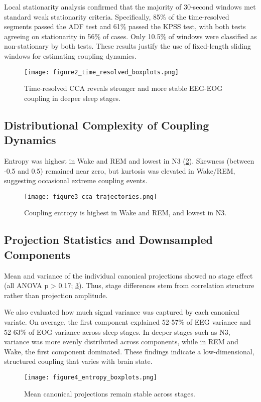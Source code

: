 Local stationarity analysis confirmed that the majority of 30-second windows met standard weak stationarity criteria. Specifically, 85\% of the time-resolved segments passed the ADF test and 61\% passed the KPSS test, with both tests agreeing on stationarity in 56\% of cases. Only 10.5\% of windows were classified as non-stationary by both tests. These results justify the use of fixed-length sliding windows for estimating coupling dynamics.
\begin{figure}
\centering
\texttt{[image: figure2\_time\_resolved\_boxplots.png]} %
\caption{Time-resolved CCA reveals stronger and more stable EEG-EOG coupling in deeper sleep stages.}\label{fig:figure2}
\end{figure}

\subsection{Distributional Complexity of Coupling Dynamics}

Entropy was highest in Wake and REM and lowest in N3 (\ref{fig:figure3}). Skewness (between -0.5 and 0.5) remained near zero, but kurtosis was elevated in Wake/REM, suggesting occasional extreme coupling events.

\begin{figure}
\centering
\texttt{[image: figure3\_cca\_trajectories.png]} %
\caption{Coupling entropy is highest in Wake and REM, and lowest in N3.}\label{fig:figure3}
\end{figure}

\subsection{Projection Statistics and Downsampled Components}

Mean and variance of the individual canonical projections showed no stage effect (all ANOVA p > 0.17; \ref{fig:figure4}). Thus, stage differences stem from correlation structure rather than projection amplitude.

We also evaluated how much signal variance was captured by each canonical variate. On average, the first component explained 52-57\% of EEG variance and 52-63\% of EOG variance across sleep stages. In deeper stages such as N3, variance was more evenly distributed across components, while in REM and Wake, the first component dominated. These findings indicate a low-dimensional, structured coupling that varies with brain state.
\begin{figure}
\centering
\texttt{[image: figure4\_entropy\_boxplots.png]}
\caption{Mean canonical projections remain stable across stages.}\label{fig:figure4}
\end{figure}

